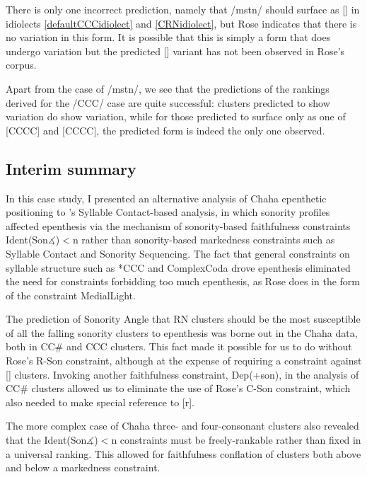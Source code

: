 \documentclass[12pt]{article}
\begin{document}
\newpage

There is only one incorrect prediction, namely that /mstn/ should surface as [] in idiolects \ref{defaultCCCidiolect} and \ref{CRNidiolect}, but Rose indicates that there is no variation in this form. It is possible that this is simply a form that does undergo variation but the predicted [] variant has not been observed in Rose's corpus.

Apart from the case of /mstn/, we see that the predictions of the rankings derived for the /CCC/ case are quite successful: clusters predicted to show variation do show variation, while for those predicted to surface only as one of [CCCC] and [CCCC], the predicted form is indeed the only one observed.

\subsection{Interim summary}

In this case study, I presented an alternative analysis of Chaha epenthetic positioning to \citet{rose.2000}'s Syllable Contact-based analysis, in which sonority profiles affected epenthesis via the mechanism of sonority-based faithfulness constraints {\sc Ident(Son$\measuredangle$)}$<$n rather than sonority-based markedness constraints such as Syllable Contact and Sonority Sequencing. The fact that general constraints on syllable structure such as *CCC and {\sc *ComplexCoda} drove epenthesis eliminated the need for constraints forbidding too much epenthesis, as Rose does in the form of the constraint {\sc *MedialLight}.

The prediction of {\sc Sonority Angle} that RN clusters should be the most susceptible of all the falling sonority clusters to epenthesis was borne out in the Chaha data, both in CC\# and CCC clusters. This fact made it possible for us to do without Rose's {\sc *R-Son} constraint, although at the expense of requiring a constraint against [] clusters. Invoking another faithfulness constraint, {\sc Dep}(+son), in the analysis of CC\# clusters allowed us to eliminate the use of Rose's {\sc *C-Son} constraint, which also needed to make special reference to [r].

The more complex case of Chaha three- and four-consonant clusters also revealed that the {\sc Ident(Son$\measuredangle$)}$<$n constraints must be freely-rankable rather than fixed in a universal ranking. This allowed for faithfulness conflation of clusters both above and below a markedness constraint.
\end{document}
